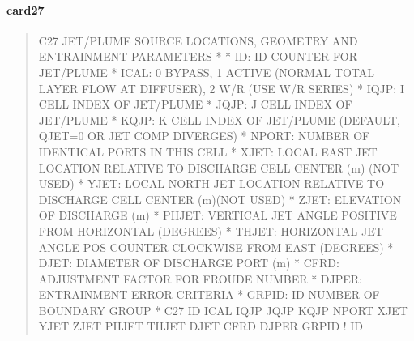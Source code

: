 \documentclass[letterpaper,10pt,english]{sphinxmanual}
\begin{document}
\paragraph{card27}
\label{\detokenize{inputfiles/runcontrol/card27:card27}}\label{\detokenize{inputfiles/runcontrol/card27::doc}}\begin{quote}

\begin{sphinxVerbatim}[commandchars=\\\{\}]
\PYGZhy{}\PYGZhy{}\PYGZhy{}\PYGZhy{}\PYGZhy{}\PYGZhy{}\PYGZhy{}\PYGZhy{}\PYGZhy{}\PYGZhy{}\PYGZhy{}\PYGZhy{}\PYGZhy{}\PYGZhy{}\PYGZhy{}\PYGZhy{}\PYGZhy{}\PYGZhy{}\PYGZhy{}\PYGZhy{}\PYGZhy{}\PYGZhy{}\PYGZhy{}\PYGZhy{}\PYGZhy{}\PYGZhy{}\PYGZhy{}\PYGZhy{}\PYGZhy{}\PYGZhy{}\PYGZhy{}\PYGZhy{}\PYGZhy{}\PYGZhy{}\PYGZhy{}\PYGZhy{}\PYGZhy{}\PYGZhy{}\PYGZhy{}\PYGZhy{}\PYGZhy{}\PYGZhy{}\PYGZhy{}\PYGZhy{}\PYGZhy{}\PYGZhy{}\PYGZhy{}\PYGZhy{}\PYGZhy{}\PYGZhy{}\PYGZhy{}\PYGZhy{}\PYGZhy{}\PYGZhy{}\PYGZhy{}\PYGZhy{}\PYGZhy{}\PYGZhy{}\PYGZhy{}\PYGZhy{}\PYGZhy{}\PYGZhy{}\PYGZhy{}\PYGZhy{}\PYGZhy{}\PYGZhy{}\PYGZhy{}\PYGZhy{}\PYGZhy{}\PYGZhy{}\PYGZhy{}\PYGZhy{}\PYGZhy{}\PYGZhy{}\PYGZhy{}\PYGZhy{}\PYGZhy{}\PYGZhy{}
C27 JET/PLUME SOURCE LOCATIONS, GEOMETRY AND ENTRAINMENT PARAMETERS
*
*    ID: ID COUNTER FOR JET/PLUME
*  ICAL: 0 BYPASS,  1 ACTIVE (NORMAL \PYGZhy{} TOTAL LAYER FLOW AT DIFFUSER),  2 \PYGZhy{} W/R (USE W/R SERIES)
*  IQJP: I CELL INDEX OF JET/PLUME
*  JQJP: J CELL INDEX OF JET/PLUME
*  KQJP: K CELL INDEX OF JET/PLUME (DEFAULT, QJET=0 OR JET COMP DIVERGES)
* NPORT: NUMBER OF IDENTICAL PORTS IN THIS CELL
*  XJET: LOCAL EAST JET LOCATION RELATIVE TO DISCHARGE CELL CENTER (m) (NOT USED)
*  YJET: LOCAL NORTH JET LOCATION RELATIVE TO DISCHARGE CELL CENTER (m)(NOT USED)
*  ZJET: ELEVATION OF DISCHARGE (m)
* PHJET: VERTICAL JET ANGLE POSITIVE FROM HORIZONTAL (DEGREES)
* THJET: HORIZONTAL JET ANGLE POS COUNTER CLOCKWISE FROM EAST (DEGREES)
*  DJET: DIAMETER OF DISCHARGE PORT (m)
*  CFRD: ADJUSTMENT FACTOR FOR FROUDE NUMBER
* DJPER: ENTRAINMENT ERROR CRITERIA
* GRPID: ID NUMBER OF BOUNDARY GROUP
*
C27      ID    ICAL    IQJP    JQJP    KQJP   NPORT    XJET    YJET    ZJET   PHJET   THJET    DJET    CFRD   DJPER     GRPID ! ID
\end{sphinxVerbatim}
\end{quote}
\end{document}
